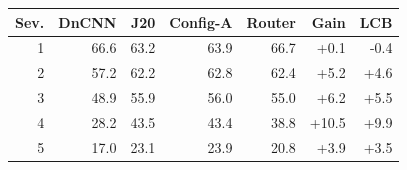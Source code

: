 \begin{tabular}{rrrrrrr}
\toprule
Sev. & DnCNN & J20 & Config-A & Router & Gain & LCB \\
\midrule
1 & 66.6 & 63.2 & 63.9 & 66.7 & +0.1 & -0.4 \\
2 & 57.2 & 62.2 & 62.8 & 62.4 & +5.2 & +4.6 \\
3 & 48.9 & 55.9 & 56.0 & 55.0 & +6.2 & +5.5 \\
4 & 28.2 & 43.5 & 43.4 & 38.8 & +10.5 & +9.9 \\
5 & 17.0 & 23.1 & 23.9 & 20.8 & +3.9 & +3.5 \\
\bottomrule
\end{tabular}
